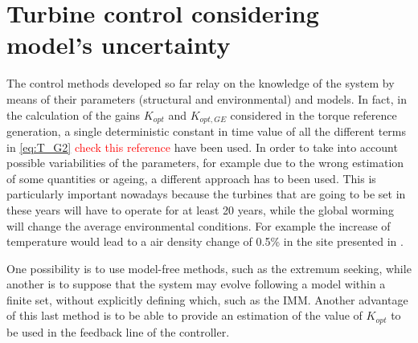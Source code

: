 \section{Turbine control considering model's uncertainty}\label{sec:c_other_controls}
The control methods developed so far relay on the knowledge of the system by means of their parameters (structural and environmental) and models. In fact, in the calculation of the gains $K_{opt}$ and $K_{opt,GE}$ considered in the torque reference generation, a single deterministic constant in time value of all the different terms in \autoref{eq:T_G2} \textcolor{red}{check this reference} have been used. In order to take into account possible variabilities of the parameters, for example due to the wrong estimation of some quantities or ageing, a different approach has to been used. This is particularly important nowadays because the turbines that are going to be set in these years will have to operate for at least 20 years, while the global worming will change the average environmental conditions. For example the increase of temperature would lead to a air density change of 0.5\% in the site presented in \cite{en12112038}.

One possibility is to use model-free methods, such as the extremum seeking, while another is to suppose that the system may evolve following a model within a finite set, without explicitly defining which, such as the \acrfull{IMM}. Another advantage of this last method is to be able to provide an estimation of the value of $K_{opt}$ to be used in the feedback line of the controller. 

